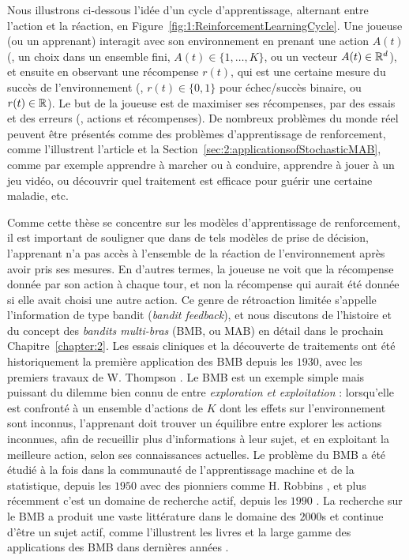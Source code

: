 \begin{resume_fr}
Nous illustrons ci-dessous l'idée d'un cycle d'apprentissage, alternant entre l'action et la réaction,
en Figure~\ref{fig:1:ReinforcementLearningCycle}.
Une joueuse (ou un apprenant) interagit avec son environnement en prenant une action $A(t)$ (\eg, un choix dans un ensemble fini, $A(t)\in\{1,\dots,K\}$, ou un vecteur $A(t)\in\mathbb{R}^d$), et ensuite en observant une récompense $r(t)$, qui est une certaine mesure du succès de l'environnement (\eg, $r(t)\in\{0,1\}$ pour échec/succès binaire, ou $r(t)\in\mathbb{R}$).
Le but de la joueuse est de maximiser ses récompenses, par des essais et des erreurs (\ie, actions et récompenses).
De nombreux problèmes du monde réel peuvent être présentés comme des problèmes d'apprentissage de renforcement, comme l'illustrent l'article \cite{bouneffouf2019survey} et la Section~\ref{sec:2:applicationsofStochasticMAB}, comme par exemple apprendre à marcher ou à conduire, apprendre à jouer à un jeu vidéo, ou découvrir quel traitement est efficace pour guérir une certaine maladie, etc.


Comme cette thèse se concentre sur les modèles d'apprentissage de renforcement,
il est important de souligner que dans de tels modèles de prise de décision, l'apprenant n'a pas accès à l'ensemble de la réaction de l'environnement après avoir pris ses mesures.
%
En d'autres termes, la joueuse ne voit que la récompense donnée par son action à chaque tour, et non la récompense qui aurait été donnée si elle avait choisi une autre action.
Ce genre de rétroaction limitée s'appelle l'information de type bandit (\emph{bandit feedback}), et nous discutons de l'histoire et du concept des \emph{bandits multi-bras} (BMB, ou MAB) en détail dans le prochain Chapitre~\ref{chapter:2}.
Les essais cliniques et la découverte de traitements ont été historiquement la première application des BMB depuis les $1930$, avec les premiers travaux de W. Thompson \cite{Thompson33}.
%
Le BMB est un exemple simple mais puissant du dilemme bien connu de entre \emph{exploration et exploitation} :
lorsqu'elle est confronté à un ensemble d'actions de $K$ dont les effets sur l'environnement sont inconnus, l'apprenant doit trouver un équilibre entre
explorer les actions inconnues, afin de recueillir plus d'informations à leur sujet,
et en exploitant la meilleure action, selon ses connaissances actuelles.
%
Le problème du BMB a été étudié à la fois dans la communauté de l'apprentissage machine et de la statistique, depuis les $1950$ avec des pionniers comme H. Robbins \cite{Robbins52}, et plus récemment c'est un domaine de recherche actif, depuis les $1990$ \cite{Anantharam87a,Anantharam87b,auer1995gambling,Agrawal95}.
La recherche sur le BMB a produit une vaste littérature dans le domaine des $2000$s \cite{Auer02,Auer02NonStochastic,Audibert2009minimax} et continue d'être un sujet actif, comme l'illustrent les livres \cite{Bubeck12,LattimoreBanditAlgorithmsBook,Slivkins2019} et la large gamme des applications des BMB dans dernières années \cite{bouneffouf2019survey}.



\end{resume_fr}
